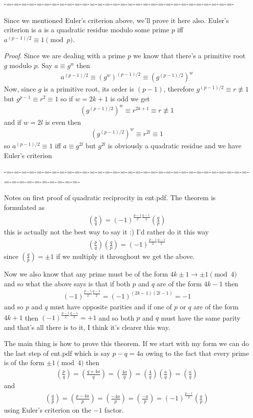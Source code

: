 \documentclass[aps,preprint,preprintnumbers,nofootinbib,showpacs,prd]{revtex4-1}
\newcommand{\nbea}{\begin{eqnarray*}}
\newcommand{\neea}{\end{eqnarray*}}
\begin{document}
-=-=-=-=-=-=-=-=-=-=-=-=-=-=-=-=-=-=-=-=-=-=-=-=-=-=-=-=-=-=-

Since we mentioned Euler's criterion above, we'll prove it here also. Euler's criterion is $a$ is a quadratic residue modulo some prime $p$ iff $a^{(p-1)/2} \equiv 1 \pmod{p}$.

{\it Proof}. Since we are dealing with a prime $p$ we know that there's a primitive root $g$ modulo $p$. Say $a \equiv g^w$ then
%
\nbea
a^{(p-1)/2} \equiv (g^w)^{(p-1)/2} \equiv (g^{(p-1)/2})^w
\neea
%
Now, since $g$ is a primitive root, its order is $(p-1)$, therefore $g^{(p-1)/2} \equiv r \not\equiv 1$ but $g^{p-1} \equiv r^2 \equiv 1$ so if $w = 2k+1$ is odd we get
%
\nbea
(g^{(p-1)/2})^w \equiv r^{2k + 1} \equiv r \not\equiv 1
\neea
%
and if $w = 2l$ is even then
%
\nbea
(g^{(p-1)/2})^w \equiv r^{2l} \equiv 1
\neea
%
so $a^{(p-1)/2} \equiv 1$ iff $a \equiv g^{2l}$ but $g^{2l}$ is obviously a quadratic residue and we have Euler's criterion

-=-=-=-=-=-=-=-=-=-=-=-=-=-=-=-=-=-=-=-=-=-=-=-=-=-=-=-=-=-=-=-=-=-=-=-=-=-=-=-=-=-=-

Notes on first proof of quadratic reciprocity in ent.pdf. The theorem is formulated as
%
\nbea
\left(\frac{p}{q}\right) = (-1)^{\frac{p-1}{2}\frac{q-1}{2}} \left( \frac{q}{p} \right)
\neea
%
this is actually not the best way to say it :) I'd rather do it this way
%
\nbea
\left(\frac{p}{q}\right) \left( \frac{q}{p} \right) = (-1)^{\frac{p-1}{2}\frac{q-1}{2}} 
\neea
%
since $\left( \frac{q}{p} \right) = \pm 1$ if we multiply it throughout we get the above.

Now we also know that any prime must be of the form $4k\pm 1 \to \pm 1 \pmod{4}$ and so what the above says is that if both $p$ and $q$ are of the form $4k-1$ then
%
\nbea
(-1)^{\frac{p-1}{2}\frac{q-1}{2}}  = (-1)^{(2k-1)(2l-1)} = -1 
\neea
%
and so $p$ and $q$ must have opposite parities and if one of $p$ or $q$ are of the form $4k+1$ then $(-1)^{\frac{p-1}{2}\frac{q-1}{2}} = +1$ and so both $p$ and $q$ must have the same parity and that's all there is to it, I think it's clearer this way.

The main thing is how to prove this theorem. If we start with my form we can do the last step of ent.pdf which is say $p - q = 4a$ owing to the fact that every prime is of the form $\pm 1 \pmod{4}$ then
%
\nbea
\left(\frac{p}{q}\right) = \left(\frac{q + 4a}{q}\right) = \left(\frac{4a}{q}\right) = \left(\frac{4}{q}\right)\left(\frac{a}{q}\right) = \left(\frac{a}{q}\right)
\neea
%
and
%
\nbea
\left(\frac{q}{p}\right) = \left(\frac{p - 4a}{p}\right) = \left(\frac{-4a}{p}\right) = \left(\frac{-a}{p}\right) = (-1)^{\frac{p-1}{2}} \left(\frac{a}{p}\right)
\neea
%
using Euler's criterion on the $-1$ factor.
\end{document}
